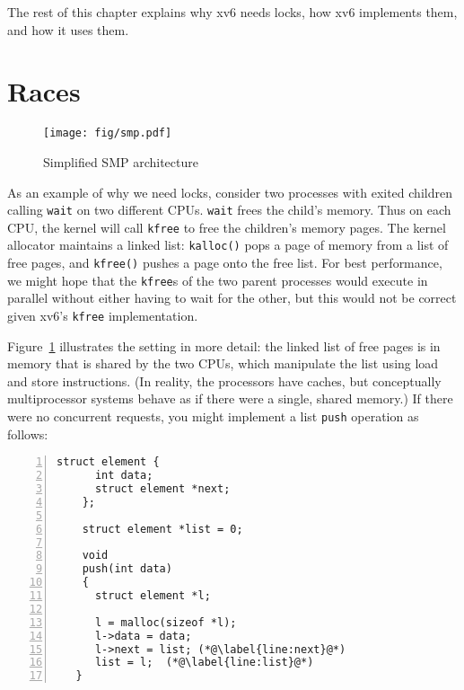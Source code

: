 The rest of this chapter explains why xv6 needs locks, how xv6
implements them, and how it uses them.


% 

\section{Races}

\begin{figure}[t]
\center
\texttt{[image: fig/smp.pdf]}
\caption{Simplified SMP architecture}
\label{fig:smp}
\end{figure}

As an example of why we need locks, consider two processes
with exited children calling
{\tt wait} on two different
CPUs.  {\tt wait} frees the child's memory.
Thus
on each CPU, the kernel will call {\tt kfree}
to free the children's memory pages.  The kernel allocator maintains a linked
list: \lstinline{kalloc()}  pops a
page of memory from a list of free pages, and \lstinline{kfree()}
 pushes a page onto the free list.
For best performance, we might hope that the {\tt kfree}s of the two parent processes
would execute in parallel without either having to wait for the other,
but this would not be correct given xv6's {\tt kfree} implementation.

Figure~\ref{fig:smp} illustrates the setting in more detail: the
linked list of free pages is in memory that is shared by the two CPUs, which
manipulate the list using load and store instructions.  (In
reality, the processors have caches, but conceptually 
multiprocessor systems behave as if there were a single, shared memory.)
If there were no concurrent
requests, you might implement a list \lstinline{push} operation as
follows:
\begin{lstlisting}[numbers=left,firstnumber=1]
    struct element {
      int data;
      struct element *next;
    };
    
    struct element *list = 0;
    
    void
    push(int data)
    {
      struct element *l;
   
      l = malloc(sizeof *l);
      l->data = data;
      l->next = list; (*@\label{line:next}@*)
      list = l;  (*@\label{line:list}@*)
   }
\end{lstlisting}


